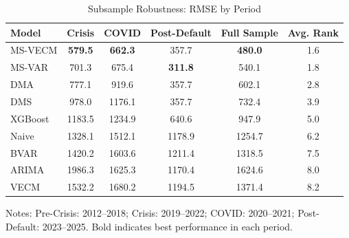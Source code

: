 \begin{table}[htbp]
\centering
\small
\caption{Subsample Robustness: RMSE by Period}
\label{tab:subsample}
\begin{tabular}{lccccc}
\toprule
Model & Crisis & COVID & Post-Default & Full Sample & Avg. Rank \\
\midrule
MS-VECM & \textbf{579.5} & \textbf{662.3} & 357.7 & \textbf{480.0} & 1.6 \\
MS-VAR & 701.3 & 675.4 & \textbf{311.8} & 540.1 & 1.8 \\
DMA & 777.1 & 919.6 & 357.7 & 602.1 & 2.8 \\
DMS & 978.0 & 1176.1 & 357.7 & 732.4 & 3.9 \\
XGBoost & 1183.5 & 1234.9 & 640.6 & 947.9 & 5.0 \\
Naive & 1328.1 & 1512.1 & 1178.9 & 1254.7 & 6.2 \\
BVAR & 1420.2 & 1603.6 & 1211.4 & 1318.5 & 7.5 \\
ARIMA & 1986.3 & 1625.3 & 1170.4 & 1624.6 & 8.0 \\
VECM & 1532.2 & 1680.2 & 1194.5 & 1371.4 & 8.2 \\
\bottomrule
\end{tabular}
\begin{tablenotes}
\small
\item Notes: Pre-Crisis: 2012--2018; Crisis: 2019--2022; 
COVID: 2020--2021; Post-Default: 2023--2025. 
Bold indicates best performance in each period.
\end{tablenotes}
\end{table}